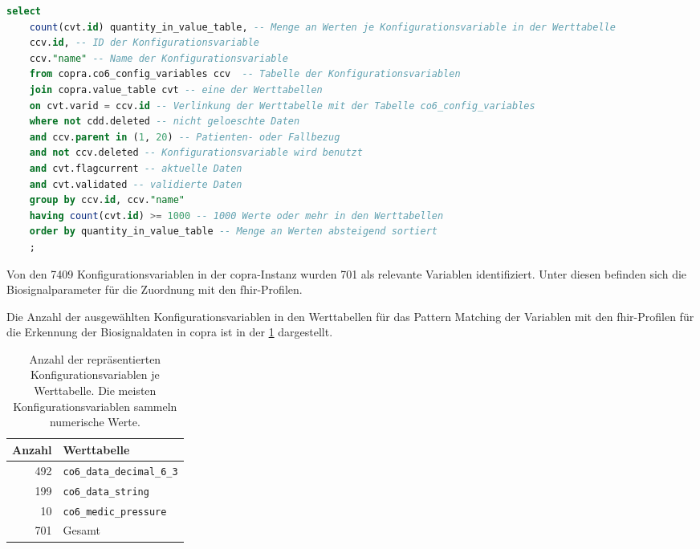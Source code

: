 \begin{lstlisting}[language=SQL, caption={[SQL-Abfrage zur Auswahl der Konfigurationsvariablen] SQL-Abfrage zur Auswahl der Konfigurationsvariablen im COPRA-System. \glqq copra.value\_table cvt\grqq{} stellt die verschiedenen Werttabellen im System dar: co6\_data\_decimal\_6\_3, co6\_data\_string und co6\_medic\_pressure. \glqq quantity\_in\_value\_table\grqq{} ist ein Alias für die Spalte der Menge an Werten in den Werttabellen.}, captionpos=b, label=list:selectconfigvar]
	select 
	count(cvt.id) quantity_in_value_table, -- Menge an Werten je Konfigurationsvariable in der Werttabelle
	ccv.id, -- ID der Konfigurationsvariable
	ccv."name" -- Name der Konfigurationsvariable
	from copra.co6_config_variables ccv  -- Tabelle der Konfigurationsvariablen 
	join copra.value_table cvt -- eine der Werttabellen
	on cvt.varid = ccv.id -- Verlinkung der Werttabelle mit der Tabelle co6_config_variables
	where not cdd.deleted -- nicht geloeschte Daten
	and ccv.parent in (1, 20) -- Patienten- oder Fallbezug
	and not ccv.deleted -- Konfigurationsvariable wird benutzt
	and cvt.flagcurrent -- aktuelle Daten
	and cvt.validated -- validierte Daten
	group by ccv.id, ccv."name" 
	having count(cvt.id) >= 1000 -- 1000 Werte oder mehr in den Werttabellen
	order by quantity_in_value_table -- Menge an Werten absteigend sortiert
	;
\end{lstlisting}

Von den 7409 Konfigurationsvariablen in der \ac{copra}-Instanz wurden 701 als relevante Variablen identifiziert. Unter diesen befinden sich die Biosignalparameter für die Zuordnung mit den \ac{fhir}-Profilen.

Die Anzahl der ausgewählten Konfigurationsvariablen in den Werttabellen für das Pattern Matching der Variablen mit den \ac{fhir}-Profilen für die Erkennung der Biosignaldaten in \ac{copra} ist in der \ref{tab:configvarvaluetables} dargestellt.

\begin{table}[ht]
	\centering  
	\caption[Anzahl der repräsentierten Konfigurationsvariablen je Werttabelle]{Anzahl der repräsentierten Konfigurationsvariablen je Werttabelle. Die meisten Konfigurationsvariablen sammeln numerische Werte.}
	
	\label{tab:configvarvaluetables}
	\begin{tabular}{|r|l|}
		\hline
		\bfseries Anzahl & \bfseries Werttabelle \\ \hline
		492 & \texttt{co6\_data\_decimal\_6\_3} \\ \hline
		199 & \texttt{co6\_data\_string} \\ \hline
		10 & \texttt{co6\_medic\_pressure} \\ \hline
		701 & Gesamt \\ \hline 
	\end{tabular}
\end{table}